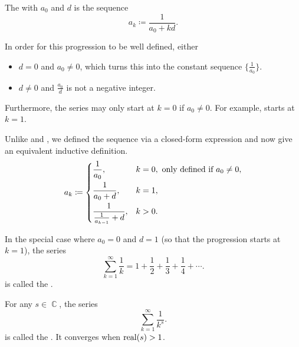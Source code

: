\begin{definition}\label{def:harmonic_progression}
  The  with  \( a_0 \) and  \( d \) is the sequence
  \begin{equation*}
    a_k \coloneqq \frac 1 {a_0 + kd}.
  \end{equation*}

  \begin{thmenum}
     In order for this progression to be well defined, either
    \begin{itemize}
      \item \( d = 0 \) and \( a_0 \neq 0 \), which turns this into the constant sequence \( \{ \tfrac 1 {a_0} \} \).

      \item \( d \neq 0 \) and \( \frac {a_0} d \) is not a negative integer.
    \end{itemize}

    Furthermore, the series may only start at \( k = 0 \) if \( a_0 \neq 0 \). For example,  starts at \( k = 1 \).

     Unlike  and , we defined the sequence via a closed-form expression and now give an equivalent inductive definition. \begin{equation*}
      a_k \coloneqq \begin{dcases}
        \frac 1 {a_0},                   & k = 0, \text{ only defined if } a_0 \neq 0, \\
        \frac 1 {a_0 + d},               & k = 1,                                      \\
        \frac 1 {\frac 1 {a_{k-1}} + d}, & k > 0.
      \end{dcases}
    \end{equation*}

     In the special case where \( a_0 = 0 \) and \( d = 1 \) (so that the progression starts at \( k = 1 \)), the series
    \begin{equation}\label{def:harmonic_progression/harmonic_series}
      \sum_{k=1}^\infty \frac 1 k = 1 + \frac 1 2 + \frac 1 3 + \frac 1 4 + \cdots.
    \end{equation}
    is called the .

     For any \( s \in \BbbC \), the series
    \begin{equation*}
      \sum_{k=1}^\infty \frac 1 {k^s}.
    \end{equation*}
    is called the . It converges when \( \operatorname{real}(s) > 1 \).
  \end{thmenum}
\end{definition}
